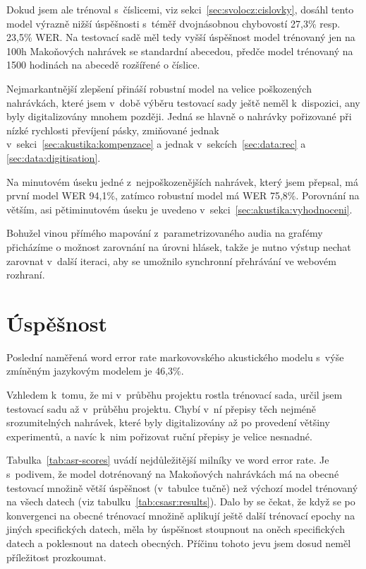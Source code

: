 Dokud jsem ale trénoval s~číslicemi, viz sekci~\ref{sec:svolocz:cislovky},
dosáhl tento model výrazně nižší úspěšnosti s~téměř dvojnásobnou chybovostí
27,3\% resp. 23,5\% WER.
Na testovací sadě měl tedy vyšší úspěšnost model trénovaný jen na 100h Makoňových
nahrávek se standardní abecedou, předče model trénovaný na 1500 hodinách na
abecedě rozšířené o číslice.


Nejmarkantnější zlepšení přináší robustní model na velice poškozených nahrávkách, které jsem
v~době výběru testovací sady ještě neměl k~dispozici, any byly digitalizovány
mnohem později. Jedná se hlavně o nahrávky pořizované při nízké rychlosti
převíjení pásky, zmiňované jednak v~sekci~\ref{sec:akustika:kompenzace} a jednak
v~sekcích~\ref{sec:data:rec} a \ref{sec:data:digitisation}.

Na minutovém úseku jedné z~nejpoškozenějších nahrávek, který jsem
přepsal, má první model WER 94,1\%, zatímco robustní model má WER
75,8\%. Porovnání na větším, asi pětiminutovém úseku je uvedeno
v~sekci~\ref{sec:akustika:vyhodnoceni}.

Bohužel vinou přímého mapování z~parametrizovaného audia na grafémy přicházíme o
možnost zarovnání na úrovni hlásek, takže je nutno výstup nechat zarovnat
v~další iteraci, aby se umožnilo synchronní přehrávání ve webovém rozhraní.

\section{Úspěšnost}
\label{sec:evaluace}

Poslední naměřená word error rate markovovského akustického modelu s~výše zmíněným
jazykovým modelem je 46,3\%.

Vzhledem k~tomu, že mi v~průběhu projektu rostla trénovací sada, určil jsem testovací sadu
až v~průběhu projektu. Chybí v~ní přepisy těch
nejméně srozumitelných nahrávek, které byly digitalizovány až po provedení
většiny experimentů, a navíc k~nim pořizovat ruční přepisy je velice nesnadné.

Tabulka~\ref{tab:asr-scores} uvádí nejdůležitější milníky ve word error rate. Je
s~podivem, že model dotrénovaný na Makoňových nahrávkách má na obecné testovací
množině větší úspěšnost (v~tabulce tučně) než výchozí model trénovaný na všech datech
(viz tabulku~\ref{tab:csasr:results}). Dalo by se čekat, že
když se po konvergenci na obecné trénovací množině aplikují ještě
další trénovací epochy na jiných specifických datech, měla by úspěšnost stoupnout na
oněch specifických datech a poklesnout na datech obecných. Příčinu tohoto jevu
jsem dosud neměl příležitost prozkoumat.

